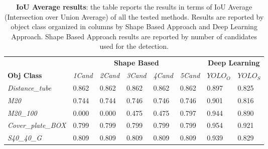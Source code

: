 \begin{table}[ht!]
 \centering

   \begin{tabular}{ llllllll }
   &\multicolumn{5}{c}{ \textbf{Shape Based} } &\multicolumn{2}{c}{ \textbf{Deep Learning} }\\
   \cmidrule(lr){2-6} \cmidrule(lr){7-8}
   \textbf{Obj Class} & \emph{1Cand} & \emph{2Cand} & \emph{3Cand} &\emph{4Cand} & \emph{5Cand} & $YOLO_O$ & $YOLO_S$\\
   \cmidrule(lr){1-8}   
   \emph{Distance\_tube} & 0.862 & 0.862 & 0.862 & 0.862 & 0.862 & \cellcolor{gray!25}0.897 & 0.825 \\ 
   \emph{M20} & 0.744 & 0.744 & 0.746 & 0.746 & 0.746 & \cellcolor{gray!25}0.901 & 0.816 \\ 
   \emph{M20\_100} & 0.000 & 0.000 & 0.475 & 0.475 & 0.797 & \cellcolor{gray!25}0.944 & 0.890 \\
   \emph{Cover\_plate\_BOX} & 0.799 & 0.799 & 0.799 & 0.799 & 0.799 & \cellcolor{gray!25}0.954 & 0.921 \\
   \emph{S40\_40\_G} & 0.809 & 0.809 & 0.809 & 0.809 & 0.809 & \cellcolor{gray!25}0.939 & 0.829 \\
   \end{tabular} 
   \caption{\textbf{IoU Average results}: the table reports the results in terms of IoU Average (Intersection over Union Average) of all the tested methods. Results are reported by object class organized in columns by Shape Based Approach and Deep Learning Approach. Shape Based Approach results are reported by number of candidates used for the detection.}
 \label{tab:big_table_results}
\end{table}

